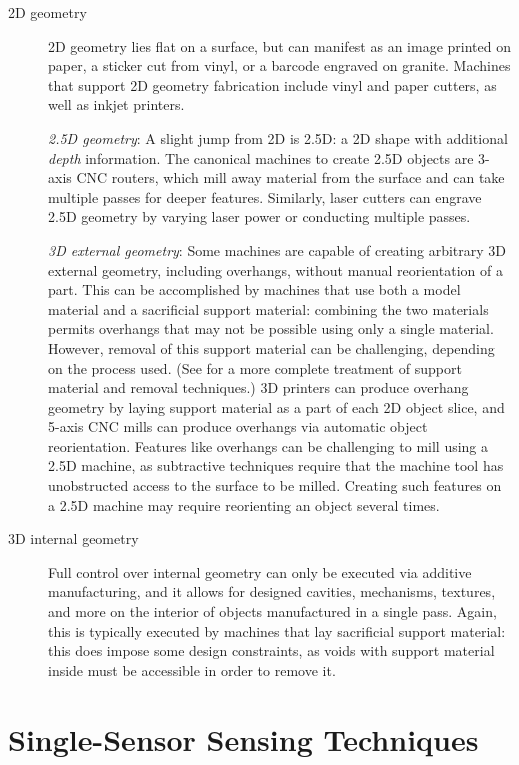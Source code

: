 \begin{description}

\item[2D geometry] 2D geometry lies flat on a surface, but can manifest as an image printed on paper, a sticker cut from vinyl, or a barcode engraved on granite. Machines that support 2D geometry fabrication include vinyl and paper cutters, as well as inkjet printers.

\emph{2.5D geometry}: A slight jump from 2D is 2.5D: a 2D shape with additional \emph{depth} information. The canonical machines to create 2.5D objects are 3-axis CNC routers, which mill away material from the surface and can take multiple passes for deeper features. Similarly, laser cutters can engrave 2.5D geometry by varying laser power or conducting multiple passes.

\emph{3D external geometry}: Some machines are capable of creating arbitrary 3D external geometry, including overhangs, without manual reorientation of a part. This can be accomplished by machines that use both a model material and a sacrificial support material: combining the two materials permits overhangs that may not be possible using only a single material. However, removal of this support material can be challenging, depending on the process used. (See \cite{savage-sot} for a more complete treatment of support material and removal techniques.) 3D printers can produce overhang geometry by laying support material as a part of each 2D object slice, and 5-axis CNC mills can produce overhangs via automatic object reorientation. Features like overhangs can be challenging to mill using a 2.5D machine, as subtractive techniques require that the machine tool has unobstructed access to the surface to be milled. Creating such features on a 2.5D machine may require reorienting an object several times. 

\item[3D internal geometry] Full control over internal geometry can only be executed via additive manufacturing, and it allows for designed cavities, mechanisms, textures, and more on the interior of objects manufactured in a single pass. Again, this is typically executed by machines that lay sacrificial support material: this does impose some design constraints, as voids with support material inside must be accessible in order to remove it.

\end{description}

\section{Single-Sensor Sensing Techniques}

